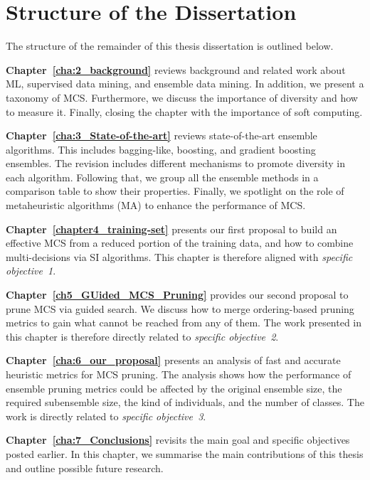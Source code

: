 \section{Structure of the Dissertation}
\label{sec:1_3_2_DissertationStructure}
The structure of the remainder of this thesis dissertation is outlined below.
\begin{description}	
	\item \textbf{Chapter~\ref{cha:2_background}} reviews background and related work about ML, supervised data mining, and ensemble data mining. In addition, we present a taxonomy of MCS. Furthermore, we discuss the importance of diversity and how to measure it. Finally, closing the chapter with the importance of soft computing.  
	
	\item \textbf{Chapter~\ref{cha:3_State-of-the-art}} reviews state-of-the-art  ensemble algorithms. This includes bagging-like, boosting, and gradient boosting ensembles. The revision includes different mechanisms to promote diversity in each algorithm. Following that, we group all the ensemble methods in a comparison table to show their properties. Finally, we spotlight on the role of metaheuristic algorithms (MA) to enhance the performance of MCS.  
	
	\item \textbf{Chapter~\ref{chapter4_training-set}} presents our first proposal to build an effective MCS from a reduced portion of the training data, and how to combine multi-decisions via SI algorithms. This chapter is therefore aligned with \emph{specific objective~1}.
	
	\item \textbf{Chapter~\ref{ch5_GUided_MCS_Pruning}} provides our second proposal to prune MCS via guided search.  We discuss how to merge ordering-based pruning metrics to gain what cannot be reached from any of them. The work presented in this chapter is therefore directly related to \emph{specific objective~2}. 
	
	\item \textbf{Chapter~\ref{cha:6_our_proposal}} presents an analysis of fast and accurate heuristic metrics for MCS pruning. The analysis shows how the performance of ensemble pruning metrics could be affected by the original ensemble size, the required subensemble size, the kind of individuals, and the number of classes. The work is directly related to \emph{specific objective~3}.
	
	\item \textbf{Chapter~\ref{cha:7_Conclusions}} revisits the main goal and specific objectives posted earlier. In this chapter, we summarise the main contributions of this thesis and outline possible future research.


\end{description}



